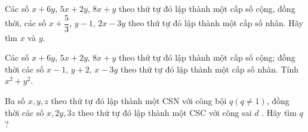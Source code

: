 \begin{bt}%

	Các số $x+6y$, $5x+2y$, $8x+y$ theo thứ tự đó lập thành một cấp số cộng, đồng thời, các số $x+\dfrac{5}{3}$, $y-1$, $2x-3y$ theo thứ tự đó lập thành một cấp số nhân. Hãy tìm $x$ và $y$.
\end{bt}

\begin{bt}%

	Các số $x+6y$, $5x+2y$, $8x+y$ theo thứ tự đó lập thành một cấp số cộng; đồng thời các số $x-1$, $y+2$, $x-3y$ theo thứ tự đó lập thành một cấp số nhân. Tính $x^2+y^2$.
\end{bt}

\begin{bt}%
	Ba số $x, y, z$ theo thứ tự đó lập thành một CSN với công bội $q (q\ne 1)$, đồng thời các số $x, 2y, 3z$ theo thứ tự đó lập thành một CSC với công sai $d$ . Hãy tìm $q$?
\end{bt}

